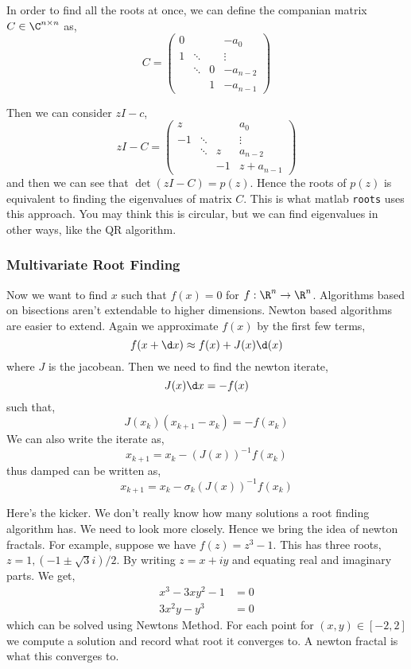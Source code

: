 \noindent
In order to find all the roots at once, we can define the companian matrix $C \in \C^{n\times n}$ as,
$$ C = \begin{pmatrix}
  0 &&& -a_0 \\
  1 & \ddots && \vdots \\
  & \ddots & 0 & -a_{n-2} \\
  && 1 & -a_{n-1}
\end{pmatrix} $$

Then we can consider $zI - c$,
$$ zI - C = \begin{pmatrix}
  z &&& a_0 \\
  -1 & \ddots && \vdots \\
  & \ddots & z & a_{n-2} \\
  && -1 & z+a_{n-1}
\end{pmatrix} $$
and then we can see that $\det (zI - C) = p(z)$. Hence the roots of $p(z)$ is equivalent to finding the eigenvalues of matrix $C$. This is what matlab \texttt{roots} uses this approach. You may think this is circular, but we can find eigenvalues in other ways, like the QR algorithm.

\subsubsection{Multivariate Root Finding}
Now we want to find $x$ such that $f(x) = 0$ for $f : \R^n \to \R^n$. Algorithms based on bisections aren't extendable to higher dimensions. Newton based algorithms are easier to extend. Again we approximate $f(x)$ by the first few terms,
$$ f(x + \d x) \approx f(x) + J(x)\d (x) $$
where $J$ is the jacobean. Then we need to find the newton iterate,
$$ J(x) \d x = -f(x) $$
such that,
$$ J(x_k) (x_{k+1} - x_k) = -f(x_k) $$
We can also write the iterate as,
$$ x_{k+1} = x_k - (J(x))^{-1}f(x_k) $$
thus damped can be written as,
$$ x_{k+1} = x_k - \sigma_k (J(x))^{-1}f(x_k)  $$


\noindent
Here's the kicker. We don't really know how many solutions a root finding algorithm has. We need to look more closely. Hence we bring the idea of newton fractals. For example, suppose we have $f(z) = z^3 - 1$. This has three roots, $z = 1, (-1 \pm \sqrt 3 i)/2$. By writing $z = x + iy$ and equating real and imaginary parts. We get,
\begin{align*}
  x^3 - 3xy^2 - 1 &= 0 \\
  3x^2y - y^3 &= 0
\end{align*}
which can be solved using Newtons Method. For each point for $(x, y) \in [-2, 2]$ we compute a solution and record what root it converges to. A newton fractal is what this converges to.